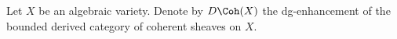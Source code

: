 

Let $X$ be an algebraic variety. Denote by $D\Coh(X)$ the dg-enhancement of the bounded derived category of coherent sheaves on $X$. 

